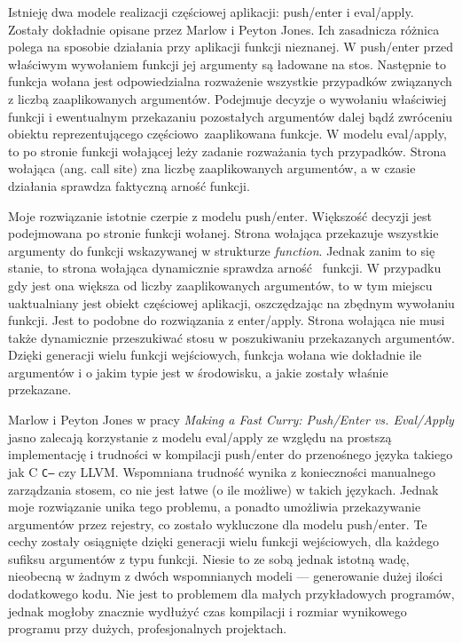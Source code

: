 \documentclass[declaration,shortabstract]{iithesis}
\begin{document}
Istnieję dwa modele realizacji częściowej aplikacji: push/enter i eval/apply. 
Zostały dokładnie opisane przez Marlow i Peyton Jones\cite{fast_curry}. 
Ich zasadnicza różnica polega na sposobie działania przy aplikacji funkcji 
nieznanej. W push/enter przed właściwym wywołaniem funkcji jej argumenty są 
ładowane na stos. Następnie to funkcja wołana jest odpowiedzialna 
rozważenie wszystkie przypadków związanych z liczbą zaaplikowanych argumentów.
Podejmuje decyzje o wywołaniu właściwiej funkcji i ewentualnym przekazaniu 
pozostałych argumentów dalej bądź zwróceniu obiektu reprezentującego częściowo\
zaaplikowana funkcje. W modelu eval/apply, to po stronie funkcji wołającej 
leży zadanie rozważania tych przypadków. Strona wołająca (ang. call site)
zna liczbę zaaplikowanych argumentów, a w czasie działania sprawdza 
faktyczną arność funkcji. 

Moje rozwiązanie istotnie czerpie z modelu push/enter. Większość decyzji
jest podejmowana po stronie funkcji wołanej. Strona wołająca przekazuje 
wszystkie argumenty do funkcji wskazywanej w strukturze \textit{function}. 
Jednak zanim to się stanie, to strona wołająca dynamicznie sprawdza arność 
funkcji. W przypadku gdy jest ona większa od liczby zaaplikowanych argumentów, 
to w tym miejscu uaktualniany jest obiekt częściowej aplikacji, oszczędzając 
na zbędnym wywołaniu funkcji. Jest to podobne do rozwiązania z enter/apply.
Strona wołająca nie musi także dynamicznie przeszukiwać stosu w poszukiwaniu 
przekazanych argumentów. Dzięki generacji wielu funkcji wejściowych, funkcja 
wołana wie dokładnie ile argumentów i o jakim typie jest w środowisku, a jakie 
zostały właśnie przekazane. 

Marlow i Peyton Jones w pracy \textit{Making a Fast Curry: Push/Enter vs.
Eval/Apply} jasno zalecają korzystanie z modelu eval/apply ze względu na 
prostszą implementację i trudności w kompilacji push/enter do przenośnego 
języka takiego jak C \texttt{C--} czy LLVM. Wspomniana trudność wynika z 
konieczności manualnego zarządzania stosem, co nie jest łatwe (o ile możliwe) 
w takich językach. Jednak moje rozwiązanie unika tego problemu, a ponadto
umożliwia przekazywanie argumentów przez rejestry, co zostało wykluczone dla 
modelu push/enter. Te cechy zostały osiągnięte dzięki generacji wielu funkcji 
wejściowych, dla każdego sufiksu argumentów z typu funkcji. Niesie to ze sobą 
jednak istotną wadę, nieobecną w żadnym z dwóch wspomnianych modeli --- 
generowanie dużej ilości dodatkowego kodu. Nie jest to problemem dla małych 
przykładowych programów, jednak mogłoby znacznie wydłużyć czas kompilacji i 
rozmiar wynikowego programu przy dużych, profesjonalnych projektach.
\end{document}
